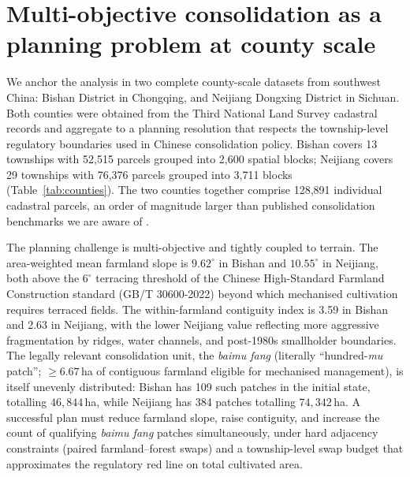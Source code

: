 \documentclass[11pt]{article}
\begin{document}
\section{Multi-objective consolidation as a planning problem at county scale}\label{sec:problem}

We anchor the analysis in two complete county-scale datasets from southwest China: Bishan District in Chongqing, and Neijiang Dongxing District in Sichuan. Both counties were obtained from the Third National Land Survey cadastral records and aggregate to a planning resolution that respects the township-level regulatory boundaries used in Chinese consolidation policy. Bishan covers 13 townships with 52{,}515 parcels grouped into 2{,}600 spatial blocks; Neijiang covers 29 townships with 76{,}376 parcels grouped into 3{,}711 blocks (Table~\ref{tab:counties}). The two counties together comprise 128{,}891 individual cadastral parcels, an order of magnitude larger than published consolidation benchmarks we are aware of \citep{cao2012boundary,zheng2023urban}.

The planning challenge is multi-objective and tightly coupled to terrain. The area-weighted mean farmland slope is $9.62^{\circ}$ in Bishan and $10.55^{\circ}$ in Neijiang, both above the $6^{\circ}$ terracing threshold of the Chinese High-Standard Farmland Construction standard (GB/T 30600-2022) beyond which mechanised cultivation requires terraced fields. The within-farmland contiguity index is 3.59 in Bishan and 2.63 in Neijiang, with the lower Neijiang value reflecting more aggressive fragmentation by ridges, water channels, and post-1980s smallholder boundaries. The legally relevant consolidation unit, the \textit{baimu fang} (literally ``hundred-\textit{mu} patch''; $\geq 6.67$\,ha of contiguous farmland eligible for mechanised management), is itself unevenly distributed: Bishan has 109 such patches in the initial state, totalling $46{,}844$\,ha, while Neijiang has 384 patches totalling $74{,}342$\,ha. A successful plan must reduce farmland slope, raise contiguity, and increase the count of qualifying \textit{baimu fang} patches simultaneously, under hard adjacency constraints (paired farmland--forest swaps) and a township-level swap budget that approximates the regulatory red line on total cultivated area.
\end{document}
